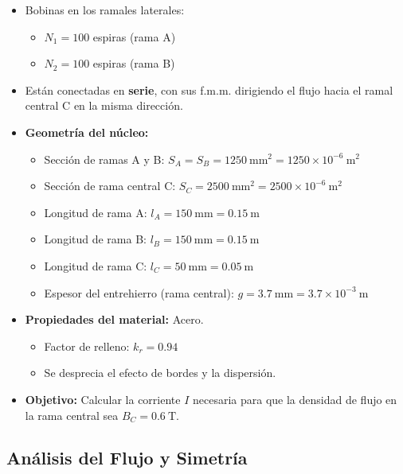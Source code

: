 \documentclass[12pt,a4paper]{article}
\begin{document}
\begin{itemize}[nosep]
    \item Bobinas en los ramales laterales:
          \begin{itemize}
              \item $N_1 = 100$ espiras (rama A)
              \item $N_2 = 100$ espiras (rama B)
          \end{itemize}
    \item Están conectadas en \textbf{serie}, con sus f.m.m. dirigiendo el flujo hacia el ramal central C en la misma dirección.
    \item \textbf{Geometría del núcleo:}
          \begin{itemize}
              \item Sección de ramas A y B: $S_A = S_B = \SI{1250}{\square\mm} = 1250 \times 10^{-6}\ \si{\square\meter}$
              \item Sección de rama central C: $S_C = \SI{2500}{\square\mm} = 2500 \times 10^{-6}\ \si{\square\meter}$
              \item Longitud de rama A: $l_A = \SI{150}{\mm} = \SI{0.15}{\meter}$
              \item Longitud de rama B: $l_B = \SI{150}{\mm} = \SI{0.15}{\meter}$
              \item Longitud de rama C: $l_C = \SI{50}{\mm} = \SI{0.05}{\meter}$
              \item Espesor del entrehierro (rama central): $g = \SI{3.7}{\mm} = 3.7 \times 10^{-3}\ \si{\meter}$
          \end{itemize}
    \item \textbf{Propiedades del material:} Acero.
          \begin{itemize}
              \item Factor de relleno: $k_r = 0.94$
              \item Se desprecia el efecto de bordes y la dispersión.
          \end{itemize}
    \item \textbf{Objetivo:} Calcular la corriente $I$ necesaria para que la densidad de flujo en la rama central sea $B_C = \SI{0.6}{\tesla}$.
\end{itemize}

\subsection{Análisis del Flujo y Simetría}
\end{document}

